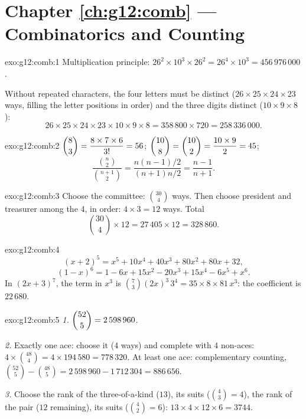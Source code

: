 \section*{Chapter \ref{ch:g12:comb} --- Combinatorics and Counting}

\begin{solution}{exo:g12:comb:1}
Multiplication principle:
$26^2 \times 10^3 \times 26^2 = 26^4 \times 10^3 = 456\,976\,000$.

Without repeated characters, the four letters must be distinct
($26 \times 25 \times 24 \times 23$ ways, filling the letter positions in
order) and the three digits distinct ($10 \times 9 \times 8$):
\[
26 \times 25 \times 24 \times 23 \times 10 \times 9 \times 8
= 358\,800 \times 720 = 258\,336\,000 .
\]
\end{solution}

\begin{solution}{exo:g12:comb:2}
$\dbinom83 = \dfrac{8 \times 7 \times 6}{3!} = 56$;
$\dbinom{10}{8} = \dbinom{10}{2} = \dfrac{10 \times 9}{2} = 45$;
\[
\frac{\binom n2}{\binom{n+1}2}
= \frac{n(n-1)/2}{(n+1)n/2} = \frac{n-1}{n+1}.
\]
\end{solution}

\begin{solution}{exo:g12:comb:3}
Choose the committee: $\binom{30}{4}$ ways. Then choose president and
treasurer among the 4, in order: $4 \times 3 = 12$ ways. Total
\[
\binom{30}{4} \times 12 = 27\,405 \times 12 = 328\,860 .
\]
\end{solution}

\begin{solution}{exo:g12:comb:4}
\[
(x+2)^5 = x^5 + 10x^4 + 40x^3 + 80x^2 + 80x + 32 ,
\]
\[
(1-x)^6 = 1 - 6x + 15x^2 - 20x^3 + 15x^4 - 6x^5 + x^6 .
\]
In $(2x+3)^7$, the term in $x^3$ is
$\binom{7}{3}(2x)^3\,3^4 = 35 \times 8 \times 81\, x^3$: the coefficient is
$22\,680$.
\end{solution}

\begin{solution}{exo:g12:comb:5}
\emph{1.} $\dbinom{52}{5} = 2\,598\,960$.

\emph{2.} Exactly one ace: choose it ($4$ ways) and complete with $4$
non-aces: $4 \times \binom{48}{4} = 4 \times 194\,580 = 778\,320$.
At least one ace: complementary counting,
$\binom{52}{5} - \binom{48}{5} = 2\,598\,960 - 1\,712\,304 = 886\,656$.

\emph{3.} Choose the rank of the three-of-a-kind ($13$), its suits
($\binom43 = 4$), the rank of the pair ($12$ remaining), its suits
($\binom42 = 6$):
$13 \times 4 \times 12 \times 6 = 3744$.
\end{solution}


